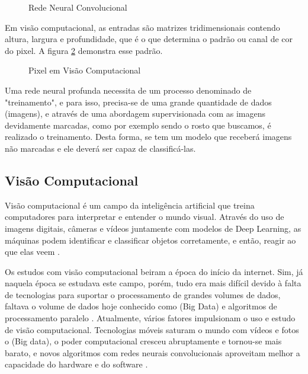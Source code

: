 %
\begin{figure}[H]
	\centering
	\caption{Rede Neural Convolucional}
	\def\svgwidth{16cm}
	
	\label{fig:neuralConv}
\end{figure}

Em visão computacional, as entradas são matrizes tridimensionais contendo altura, largura e profundidade, que é o que determina o padrão ou canal de cor do pixel. A figura \ref{fig:pixel} demonstra esse padrão.


\begin{figure}[H]
	\centering
	\caption{Pixel em Visão Computacional}
	\def\svgwidth{10cm}
	
	\label{fig:pixel}
\end{figure}

Uma rede neural profunda necessita de um processo denominado de "treinamento", e para isso, precisa-se de uma grande quantidade de dados (imagens), e através de uma abordagem supervisionada com as imagens devidamente marcadas, como por exemplo sendo o rosto que buscamos, é realizado o treinamento. Desta forma, se tem um modelo que receberá imagens não marcadas e ele deverá ser capaz de classificá-las.

\subsection{Visão Computacional}
Visão computacional é um campo da inteligência artificial que treina computadores para interpretar e entender o mundo visual. Através do uso de imagens digitais, câmeras e vídeos juntamente com modelos de Deep Learning, as máquinas podem identificar e classificar objetos corretamente, e então, reagir ao que elas veem \cite{dez}.

Os estudos com visão computacional beiram a época do início da internet. Sim, já naquela época se estudava este campo, porém, tudo era mais difícil devido à falta de tecnologias para suportar o processamento de grandes volumes de dados, faltava o volume de dados hoje conhecido como (Big Data) e algoritmos de processamento paralelo \cite{nove}. Atualmente, vários fatores impulsionam o uso e estudo de visão computacional. Tecnologias móveis saturam o mundo com vídeos e fotos o (Big data), o poder computacional cresceu abruptamente e tornou-se mais barato, e novos algoritmos com redes neurais convolucionais aproveitam melhor a capacidade do hardware e do software \cite{dez}.

